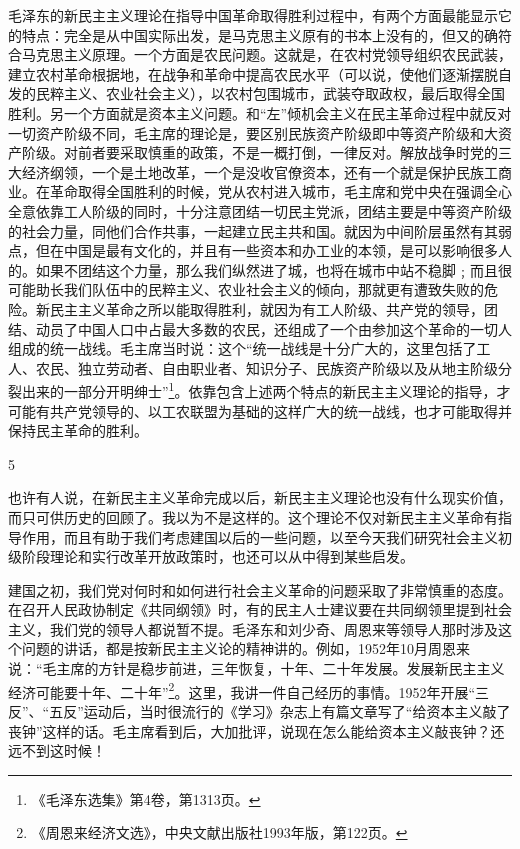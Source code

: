 \documentclass[UTF8, 12pt, a4paper]{ctexrep}
\begin{document}
毛泽东的新民主主义理论在指导中国革命取得胜利过程中，有两个方面最能显示它的特点：完全是从中国实际出发，是马克思主义原有的书本上没有的，但又的确符合马克思主义原理。一个方面是农民问题。这就是，在农村党领导组织农民武装，建立农村革命根据地，在战争和革命中提高农民水平（可以说，使他们逐渐摆脱自发的民粹主义、农业社会主义），以农村包围城市，武装夺取政权，最后取得全国胜利。另一个方面就是资本主义问题。和“左”倾机会主义在民主革命过程中就反对一切资产阶级不同，毛主席的理论是，要区别民族资产阶级即中等资产阶级和大资产阶级。对前者要采取慎重的政策，不是一概打倒，一律反对。解放战争时党的三大经济纲领，一个是土地改革，一个是没收官僚资本，还有一个就是保护民族工商业。在革命取得全国胜利的时候，党从农村进入城市，毛主席和党中央在强调全心全意依靠工人阶级的同时，十分注意团结一切民主党派，团结主要是中等资产阶级的社会力量，同他们合作共事，一起建立民主共和国。就因为中间阶层虽然有其弱点，但在中国是最有文化的，并且有一些资本和办工业的本领，是可以影响很多人的。如果不团结这个力量，那么我们纵然进了城，也将在城市中站不稳脚﹔而且很可能助长我们队伍中的民粹主义、农业社会主义的倾向，那就更有遭致失败的危险。新民主主义革命之所以能取得胜利，就因为有工人阶级、共产党的领导，团结、动员了中国人口中占最大多数的农民，还组成了一个由参加这个革命的一切人组成的统一战线。毛主席当时说：这个“统一战线是十分广大的，这里包括了工人、农民、独立劳动者、自由职业者、知识分子、民族资产阶级以及从地主阶级分裂出来的一部分开明绅士”\footnote{《毛泽东选集》第4卷，第1313页。}。依靠包含上述两个特点的新民主主义理论的指导，才可能有共产党领导的、以工农联盟为基础的这样广大的统一战线，也才可能取得并保持民主革命的胜利。

5

也许有人说，在新民主主义革命完成以后，新民主主义理论也没有什么现实价值，而只可供历史的回顾了。我以为不是这样的。这个理论不仅对新民主主义革命有指导作用，而且有助于我们考虑建国以后的一些问题，以至今天我们研究社会主义初级阶段理论和实行改革开放政策时，也还可以从中得到某些启发。

建国之初，我们党对何时和如何进行社会主义革命的问题采取了非常慎重的态度。在召开人民政协制定《共同纲领》时，有的民主人士建议要在共同纲领里提到社会主义，我们党的领导人都说暂不提。毛泽东和刘少奇、周恩来等领导人那时涉及这个问题的讲话，都是按新民主主义论的精神讲的。例如，1952年10月周恩来说：“毛主席的方针是稳步前进，三年恢复，十年、二十年发展。发展新民主主义经济可能要十年、二十年”\footnote{《周恩来经济文选》，中央文献出版社1993年版，第122页。}。这里，我讲一件自己经历的事情。1952年开展“三反”、“五反”运动后，当时很流行的《学习》杂志上有篇文章写了“给资本主义敲了丧钟”这样的话。毛主席看到后，大加批评，说现在怎么能给资本主义敲丧钟？还远不到这时候！
\end{document}
